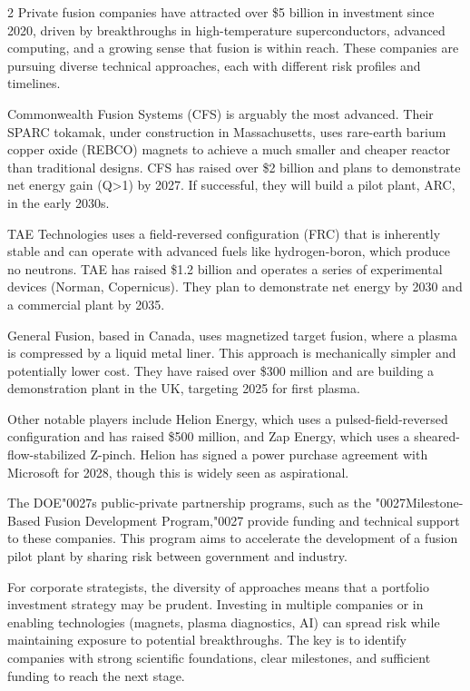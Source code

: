 \documentclass[10pt,a4paper]{article}
\newcommand{\BOApos}{{\BOQuoteFont\char"0027}}
\begin{document}
\begin{multicols}{2}
{\small Private fusion companies have attracted over \$5 billion in investment since 2020, driven by breakthroughs in high-temperature superconductors, advanced computing, and a growing sense that fusion is within reach. These companies are pursuing diverse technical approaches, each with different risk profiles and timelines.}\par
{\small Commonwealth Fusion Systems (CFS) is arguably the most advanced. Their SPARC tokamak, under construction in Massachusetts, uses rare-earth barium copper oxide (REBCO) magnets to achieve a much smaller and cheaper reactor than traditional designs. CFS has raised over \$2 billion and plans to demonstrate net energy gain (Q>1) by 2027. If successful, they will build a pilot plant, ARC, in the early 2030s.}\par
{\small TAE Technologies uses a field-reversed configuration (FRC) that is inherently stable and can operate with advanced fuels like hydrogen-boron, which produce no neutrons. TAE has raised \$1.2 billion and operates a series of experimental devices (Norman, Copernicus). They plan to demonstrate net energy by 2030 and a commercial plant by 2035.}\par
{\small General Fusion, based in Canada, uses magnetized target fusion, where a plasma is compressed by a liquid metal liner. This approach is mechanically simpler and potentially lower cost. They have raised over \$300 million and are building a demonstration plant in the UK, targeting 2025 for first plasma.}\par
{\small Other notable players include Helion Energy, which uses a pulsed-field-reversed configuration and has raised \$500 million, and Zap Energy, which uses a sheared-flow-stabilized Z-pinch. Helion has signed a power purchase agreement with Microsoft for 2028, though this is widely seen as aspirational.}\par
{\small The DOE\BOApos{}s public-private partnership programs, such as the \BOApos{}Milestone-Based Fusion Development Program,\BOApos{} provide funding and technical support to these companies. This program aims to accelerate the development of a fusion pilot plant by sharing risk between government and industry.}\par
{\small For corporate strategists, the diversity of approaches means that a portfolio investment strategy may be prudent. Investing in multiple companies or in enabling technologies (magnets, plasma diagnostics, AI) can spread risk while maintaining exposure to potential breakthroughs. The key is to identify companies with strong scientific foundations, clear milestones, and sufficient funding to reach the next stage.}\par
\end{multicols}
\label{chap:2:end}
\end{document}
